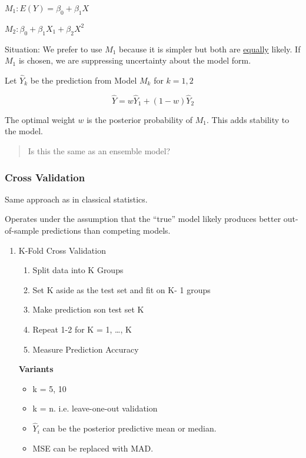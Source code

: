 \documentclass[11pt]{article}
\begin{document}
\(M_1 : E(Y) = \beta_0 + \beta_1 X\)

\(M_2 : \beta_0 + \beta_1 X_1 + \beta_2 X^2\)

Situation: We prefer to use \(M_1\) because it is simpler but both are \uline{equally}
likely. If \(M_1\) is chosen, we are suppressing uncertainty about the model form.


Let \(\hat Y_k\) be the prediction from Model \(M_k\) for \(k = 1,2\)

$$
\hat Y = w \hat Y_1 + (1 - w) \hat Y_2
$$


The optimal weight \(w\) is the posterior probability of \(M_1\). This adds
stability to the model.

\begin{quote}
Is this the same as an ensemble model?
\end{quote}

\subsubsection{Cross Validation}
\label{sec:orgf9ac1e3}

Same approach as in classical statistics.

Operates under the assumption that the ``true'' model likely produces better
out-of-sample predictions than competing models.

\begin{enumerate}
\item K-Fold Cross Validation
\label{sec:org490c42e}
\begin{enumerate}
\item Split data into K Groups
\item Set K aside as the test set and fit on K- 1 groups
\item Make prediction son test set K
\item Repeat 1-2 for K = 1, \ldots{}, K
\item Measure Prediction Accuracy
\end{enumerate}

\textbf{Variants}
\begin{itemize}
\item k = 5, 10
\item k = n. i.e. leave-one-out validation
\item \(\hat Y_i\) can be the posterior predictive mean or median.
\item MSE can be replaced with MAD.
\end{itemize}
\end{enumerate}
\end{document}
